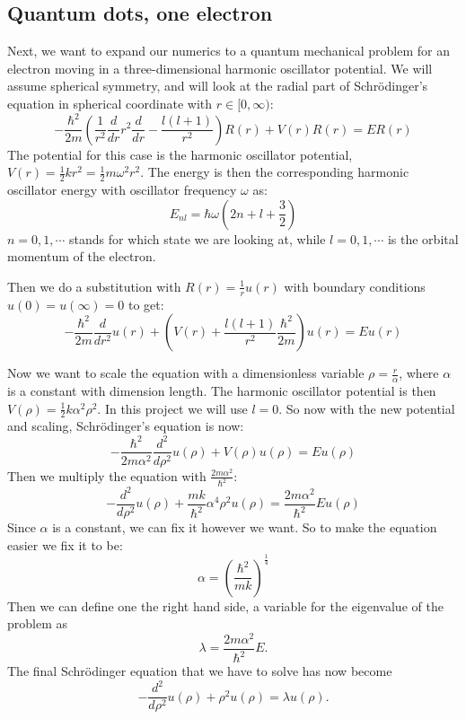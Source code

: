 \documentclass[12pt,a4paper,english]{article}
\begin{document}
\subsection{Quantum dots, one electron}
\label{sect:quantum_one}
Next, we want to expand our numerics to a quantum mechanical problem for an electron moving in a three-dimensional harmonic oscillator potential. We will assume spherical symmetry, and will look at the radial part of Schrödinger's equation in spherical coordinate with $r\in[0,\infty)$:
\begin{equation}
\label{eq:rad_schr_1}
-\frac{\hbar^2}{2m}\left(\frac{1}{r^2}\frac{d}{dr}r^2\frac{d}{dr}-\frac{l(l+1)}{r^2}\right)R(r) + V(r)R(r)=ER(r)
\end{equation}
The potential for this case is the harmonic oscillator potential, $V(r)=\frac{1}{2}kr^2=\frac{1}{2}m\omega^2r^2$. The energy is then the corresponding harmonic oscillator energy with oscillator frequency $\omega$ as:
\begin{equation}
\label{eq:HO_energy_1}
E_{nl} = \hbar \omega\left(2n + l + \frac{3}{2}\right)
\end{equation}
$n=0,1,\cdots$ stands for which state we are looking at, while $l=0,1,\cdots$ is the orbital momentum of the electron. 

Then we do a substitution with $R(r)=\frac{1}{r}u(r)$ with boundary conditions\\ $u(0)=u(\infty)=0$ to get:
\begin{equation*}
-\frac{\hbar^2}{2m}\frac{d}{dr^2}u(r)+\left(V(r)+\frac{l(l+1)}{r^2}\frac{\hbar^2}{2m}\right)u(r)=Eu(r)
\end{equation*}

Now we want to scale the equation with a dimensionless variable $\rho=\frac{r}{\alpha}$, where $\alpha$ is a constant with dimension length. The harmonic oscillator potential is then $V(\rho)=\frac{1}{2}k\alpha^2\rho^2$. In this project we will use $l=0$. So now with the new potential and scaling, Schrödinger's equation is now:
\begin{equation*}
-\frac{\hbar^2}{2m\alpha^2}\frac{d^2}{d\rho^2}u(\rho)+V(\rho)u(\rho)=Eu(\rho)
\end{equation*}
Then we multiply the equation with $\frac{2m\alpha^2}{\hbar^2}$:
\begin{equation*}
-\frac{d^2}{d\rho^2}u(\rho)+\frac{mk}{\hbar^2}\alpha^4\rho^2u(\rho)=\frac{2m\alpha^2}{\hbar^2}Eu(\rho)
\end{equation*}
Since $\alpha$ is a constant, we can fix it however we want. So to make the equation easier we fix it to be:
\[\alpha=\left(\frac{\hbar^2}{mk}\right)^{\frac{1}{4}}\]
Then we can define one the right hand side, a variable for the eigenvalue of the problem as 
\[\lambda=\frac{2m\alpha^2}{\hbar^2}E.\]
The final Schrödinger equation that we have to solve has now become
\begin{equation}
\label{eq:fin_schr_1}
-\frac{d^2}{d\rho^2}u(\rho)+\rho^2u(\rho)=\lambda u(\rho).
\end{equation}
\end{document}
